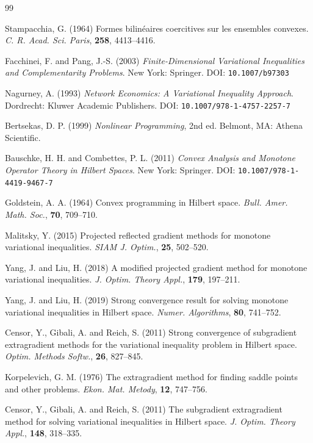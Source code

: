 \documentclass[hidelinks,11 pt]{article}
\numberwithin{equation}{section}
\theoremstyle{definition}  %
\numberwithin{equation}{section}
\numberwithin{theorem}{section}
\begin{document}
\begin{thebibliography}{99}
Stampacchia, G. (1964) Formes bilinéaires coercitives sur les ensembles convexes. \textit{C. R. Acad. Sci. Paris}, \textbf{258}, 4413--4416.

Facchinei, F. and Pang, J.-S. (2003) \textit{Finite-Dimensional Variational Inequalities and Complementarity Problems}. New York: Springer. DOI: \texttt{10.1007/b97303}

Nagurney, A. (1993) \textit{Network Economics: A Variational Inequality Approach}. Dordrecht: Kluwer Academic Publishers. DOI: \texttt{10.1007/978-1-4757-2257-7}

Bertsekas, D. P. (1999) \textit{Nonlinear Programming}, 2nd ed. Belmont, MA: Athena Scientific.

Bauschke, H. H. and Combettes, P. L. (2011) \textit{Convex Analysis and Monotone Operator Theory in Hilbert Spaces}. New York: Springer. DOI: \texttt{10.1007/978-1-4419-9467-7}

Goldstein, A. A. (1964) Convex programming in Hilbert space. \textit{Bull. Amer. Math. Soc.}, \textbf{70}, 709--710.

Malitsky, Y. (2015) Projected reflected gradient methods for monotone variational inequalities. \textit{SIAM J. Optim.}, \textbf{25}, 502--520.

Yang, J. and Liu, H. (2018) A modified projected gradient method for monotone variational inequalities. \textit{J. Optim. Theory Appl.}, \textbf{179}, 197--211.

Yang, J. and Liu, H. (2019) Strong convergence result for solving monotone variational inequalities in Hilbert space. \textit{Numer. Algorithms}, \textbf{80}, 741--752.

Censor, Y., Gibali, A. and Reich, S. (2011) Strong convergence of subgradient extragradient methods for the variational inequality problem in Hilbert space. \textit{Optim. Methods Softw.}, \textbf{26}, 827--845.

Korpelevich, G. M. (1976) The extragradient method for finding saddle points and other problems. \textit{Ekon. Mat. Metody}, \textbf{12}, 747--756.

Censor, Y., Gibali, A. and Reich, S. (2011) The subgradient extragradient method for solving variational inequalities in Hilbert space. \textit{J. Optim. Theory Appl.}, \textbf{148}, 318--335.


\end{thebibliography}
\end{document}
